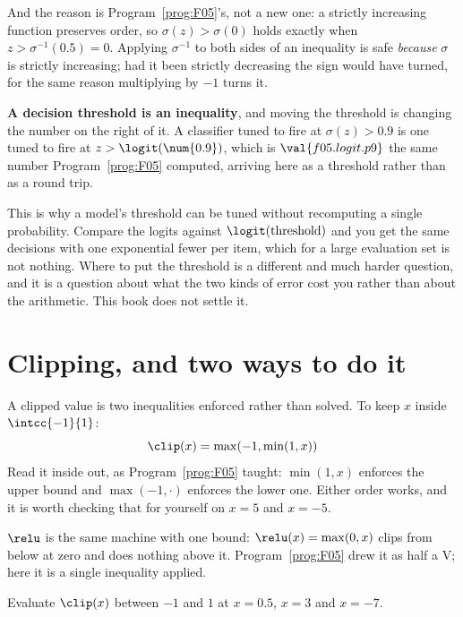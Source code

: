 \begin{fr}
And the reason is Program~\ref{prog:F05}'s, not a new one: a strictly
increasing function preserves order, so $\sigma(z) > \sigma(0)$ holds exactly
when $z > \sigma^{-1}(\num{0.5}) = 0$. Applying $\sigma^{-1}$ to both sides of
an inequality is safe \emph{because} $\sigma$ is strictly increasing; had it
been strictly decreasing the sign would have turned, for the same reason
multiplying by $-1$ turns it.

\textbf{A decision threshold is an inequality}, and moving the threshold is
changing the number on the right of it. A classifier tuned to fire at
$\sigma(z) > \num{0.9}$ is one tuned to fire at $z > \logit(\num{0.9})$, which
is $\val{f05.logit.p9}$ \dash{} the same number Program~\ref{prog:F05}
computed, arriving here as a threshold rather than as a round trip.

\begin{note}
This is why a model's threshold can be tuned without recomputing a single
probability. Compare the logits against $\logit(\text{threshold})$ and you get
the same decisions with one exponential fewer per item, which for a large
evaluation set is not nothing. Where to put the threshold is a different and
much harder question, and it is a question about what the two kinds of error
cost you rather than about the arithmetic. This book does not settle it.
\end{note}
\end{fr}

\section{Clipping, and two ways to do it}
\label{sec:F06-clipping}

\begin{fr}
A clipped value is two inequalities enforced rather than solved. To keep $x$
inside $\intcc{-1}{1}$:
\[ \clip(x) = \max(-1, \min(1, x)) \]
Read it inside out, as Program~\ref{prog:F05} taught: $\min(1, x)$ enforces the
upper bound and $\max(-1, \cdot)$ enforces the lower one. Either order works,
and it is worth checking that for yourself on $x = 5$ and $x = -5$.

$\relu$ is the same machine with one bound: $\relu(x) = \max(0, x)$ clips from
below at zero and does nothing above it. Program~\ref{prog:F05} drew it as
half a V; here it is a single inequality applied.

Evaluate $\clip(x)$ between $-1$ and $1$ at $x = \num{0.5}$, $x = 3$ and
$x = -7$.
\nextframe
\end{fr}

